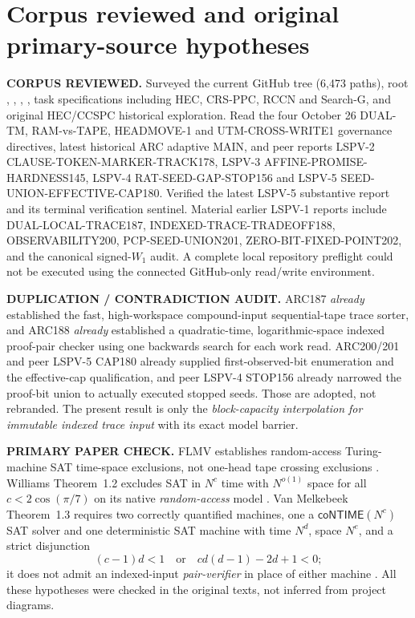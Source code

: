 \documentclass[11pt]{article}
\begin{document}
\section{Corpus reviewed and original primary-source hypotheses}
\noindent\textbf{CORPUS REVIEWED.}
Surveyed the current GitHub tree (6,473 paths), root , , , , task specifications including HEC, CRS-PPC, RCCN and Search-G, and original HEC/CCSPC historical exploration. Read the four October 26 DUAL-TM, RAM-vs-TAPE, HEADMOVE-1 and UTM-CROSS-WRITE1 governance directives, latest historical ARC adaptive MAIN, and peer reports LSPV-2 CLAUSE-TOKEN-MARKER-TRACK178, LSPV-3 AFFINE-PROMISE-HARDNESS145, LSPV-4 RAT-SEED-GAP-STOP156 and LSPV-5 SEED-UNION-EFFECTIVE-CAP180. Verified the latest LSPV-5 substantive report and its terminal verification sentinel. Material earlier LSPV-1 reports include DUAL-LOCAL-TRACE187, INDEXED-TRACE-TRADEOFF188, OBSERVABILITY200, PCP-SEED-UNION201, ZERO-BIT-FIXED-POINT202, and the canonical signed-$W_1$ audit. A complete local repository preflight could not be executed using the connected GitHub-only read/write environment.

\noindent\textbf{DUPLICATION / CONTRADICTION AUDIT.}
ARC187 \emph{already} established the fast, high-workspace compound-input sequential-tape trace sorter, and ARC188 \emph{already} established a quadratic-time, logarithmic-space indexed proof-pair checker using one backwards search for each work read. ARC200/201 and peer LSPV-5 CAP180 already supplied first-observed-bit enumeration and the effective-cap qualification, and peer LSPV-4 STOP156 already narrowed the proof-bit union to actually executed stopped seeds. Those are adopted, not rebranded. The present result is only the \emph{block-capacity interpolation for immutable indexed trace input} with its exact model barrier.

\noindent\textbf{PRIMARY PAPER CHECK.}
FLMV establishes random-access Turing-machine SAT time-space exclusions, not one-head tape crossing exclusions \cite{flmv}. Williams Theorem~1.2 excludes SAT in $N^c$ time with $N^{o(1)}$ space for all $c<2\cos(\pi/7)$ on its native \emph{random-access} model \cite{wil}. Van Melkebeek Theorem~1.3 requires two correctly quantified machines, one a $\mathsf{coNTIME}(N^c)$ SAT solver and one deterministic SAT machine with time $N^d$, space $N^e$, and a strict disjunction
\[
  (c-1)d<1\quad\text{or}\quad cd(d-1)-2d+1<0;
\]
it does not admit an indexed-input \emph{pair-verifier} in place of either machine \cite{vm}. All these hypotheses were checked in the original texts, not inferred from project diagrams.
\end{document}
